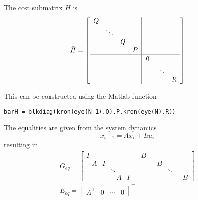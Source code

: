 \newpar{}

The cost submatrix $\bar{H}$ is
\begin{equation*}
    \bar{H} = \left[
        \begin{array}{cccc|cccc} %
            Q &        &   &   &   &        &   \\
              & \ddots &   &   &   &        &   \\
              &        & Q &   &   &        &   \\
              &        &   & P &   &        &   \\
            \hline %
              &        &   &   & R &        &   \\
              &        &   &   &   & \ddots &   \\
              &        &   &   &   &        & R
        \end{array}
        \right]
\end{equation*}

This can be constructed using the Matlab function

\begin{small}
    \texttt{barH = blkdiag(kron(eye(N-1),Q),P,kron(eye(N),R))}
\end{small}

\newpar{}

The equalities are given from the system dynamics
\begin{equation*}
    x_{i+1} = Ax_i + Bu_i
\end{equation*}
resulting in
\begin{gather*}
    G_{eq} = \left[
        \begin{array}{cccc|cccc} %
            I  &   &        &   & -B &    &        &    \\
            -A & I &        &   &    & -B &        &    \\
               &   & \ddots &   &    &    & \ddots &    \\
               &   & -A     & I &    &    &        & -B
        \end{array}
        \right] \\
    E_{eq} = \begin{bmatrix}
        A^\top & 0 & \cdots & 0
    \end{bmatrix}^\top
\end{gather*}

\newpar{}

